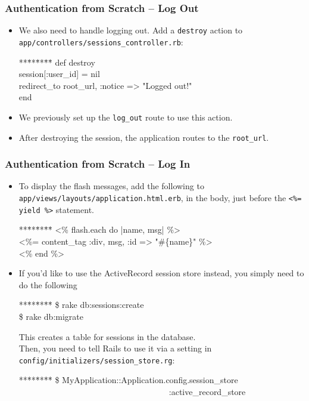 \documentclass[t,handout]{beamer}
\begin{document}
\begin{frame}\frametitle{Authentication from Scratch -- Log Out}
\begin{itemize}
\item  We also need to handle logging out.  Add a {\tt destroy} action to 
{\tt app/controllers/sessions\_controller.rb}:
{\tt\footnotesize \begin{tabbing} **\=**\=**\=**\= \kill
\>   def destroy \\
\>\>     session[:user\_id] = nil \\
\>\>    redirect\_to root\_url, :notice => "Logged out!" \\
\>  end
\end{tabbing}}
\pause
 \item We previously set up the {\tt log\_out} route to use this action.
 \pause
 \item After destroying the session, the application routes to the {\tt root\_url}.
\end{itemize}
\end{frame}

\begin{frame}\frametitle{Authentication from Scratch -- Log In}
{\small
\begin{itemize}
\item To display the flash messages, add the following to {\tt app/views/layouts/application.html.erb}, in the body, just before the {\tt <\%= yield \%>} statement.
{\tt\footnotesize \begin{tabbing} **\=**\=**\=**\= \kill
\>  <\% flash.each do |name, msg| \%> \\
\>\> <\%= content\_tag :div, msg, :id => "\#\{name\}" \%> \\
\>  <\% end \%>
  \end{tabbing}}
  \pause 
 \item If you'd like to use the ActiveRecord session store instead, you simply need to do the following
{\tt\footnotesize \begin{tabbing} **\=**\=**\=**\= \kill
\> \$ rake db:sessions:create \\
\> \$ rake db:migrate
\end{tabbing}}
This creates a table for sessions in the database.~\\
\pause
Then, you need to tell Rails to use it via a setting in {\tt config/initializers/session\_store.rg}:
{\tt\footnotesize \begin{tabbing} **\=**\=**\=**\= \kill
\> \$ MyApplication::Application.config.session\_store \\
\ \ \ \ \ \ \ \ \ \ \ \ \ \ \ \ \ \ \ \ \ \ \ \ \ \ \ \ \ \ \ \ \ \ \ \ :active\_record\_store 
\end{tabbing}}
 \end{itemize}}
\end{frame}
  
\end{document}
